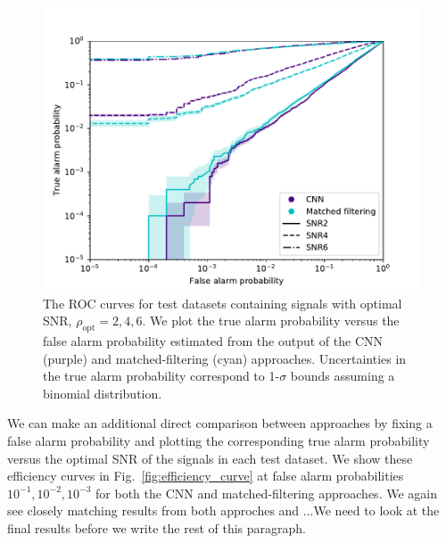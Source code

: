 \documentclass[%
showpacs,
 amsmath,amssymb,
 aps,
 twocolumn,
 prl,
 reprint,
floatfix,
]{revtex4-1}
\begin{document}
%
%
\begin{figure}[]
\includegraphics[width=\columnwidth] {figures/ROC_curves.pdf}
\caption{The \ac{ROC} curves for test datasets containing signals with optimal
\ac{SNR}, $\rho_{\mathrm{opt}}=2,4,6$. We plot the true alarm probability
versus the false alarm probability estimated from the output of the \ac{CNN}
(purple) and matched-filtering (cyan) approaches. Uncertainties in the true
alarm probability correspond to 1-$\sigma$ bounds assuming a binomial
distribution.} \label{fig:ROC_curves} 
\end{figure}

%
%
We can make an additional direct comparison between approaches by fixing a
false alarm probability and plotting the corresponding true alarm probability
versus the optimal \ac{SNR} of the signals in each test dataset. We show these
efficiency curves in Fig.~\ref{fig:efficiency_curve} at false alarm
probabilities $10^{-1},10^{-2},10^{-3}$ for both the \ac{CNN} and
matched-filtering approaches. We again see closely matching results from both
approches and ...{\color{red}We need to look at the final results before we write
the rest of this paragraph.} 

\end{document}
